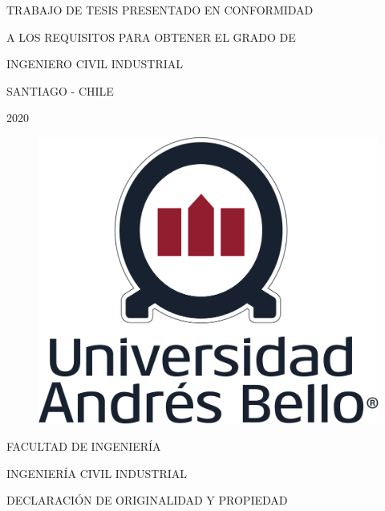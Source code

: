 \documentclass[12pt,a4paper]{article}
\begin{document}
\begin{titlepage}
\begin{center}
\begin{flushright}

TRABAJO DE TESIS PRESENTADO EN CONFORMIDAD 

A LOS REQUISITOS PARA OBTENER EL GRADO DE 

INGENIERO CIVIL INDUSTRIAL

\end{flushright}

\vspace{2cm}

SANTIAGO - CHILE

2020

\end{center}

\end{titlepage} %


\pagebreak

\begin{center}
\begin{figure}[htb]
\begin{center}
\includegraphics[scale=0.7]{Figuras/logounab.png}
\end{center}
\end{figure}

\vspace*{2cm}

FACULTAD DE INGENIERÍA \vspace*{0.5cm}

INGENIERÍA CIVIL INDUSTRIAL \vspace*{0.5cm}

DECLARACIÓN DE ORIGINALIDAD Y PROPIEDAD

\end{center}
\end{document}

